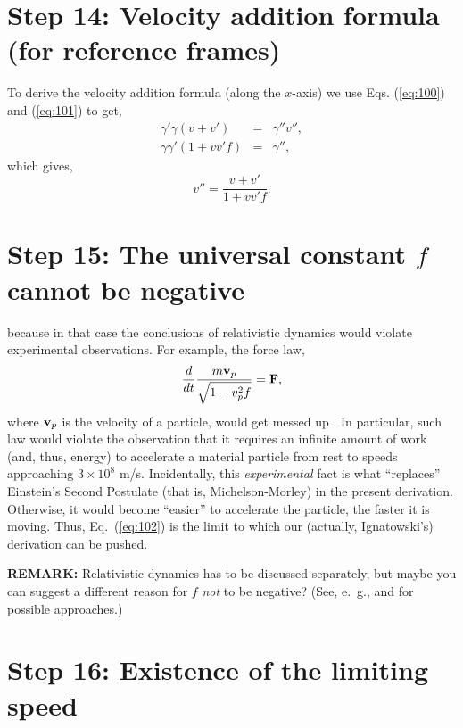 \documentclass[twocolumn,preprintnumbers,amsmath,amssymb,final]{revtex4}
\def\BEq{\begin{equation}}
\def\EEq{\end{equation}}
\def\BEqA{\begin{eqnarray}}
\def\EEqA{\end{eqnarray}}
\def\g{\gamma}
\begin{document}
\section*{Step 14: Velocity addition formula (for reference frames)}
 
\noindent To derive the velocity addition formula
(along the $x$-axis) we use Eqs. (\ref{eq:100}) and (\ref{eq:101}) to get,
\BEqA
\g'\g (v+v') &=& \g'' v'',
\\
\g \g' (1+vv' f) &=& \g'',
\EEqA
which gives,
\BEq
\label{eq:102}
v''=\frac{v+v'}{1+vv'f}.
\EEq


\section*{Step 15: The universal constant $f$ cannot be negative }
 
\noindent because in that case the conclusions of relativistic dynamics 
would violate experimental observations. For example, the force law,
\BEq
\label{eq:forceEquation}
\frac{d}{dt}\frac{m{\bf v}_{p}}{\sqrt{1-v_{p}^2f}} = {\bf F},
\EEq
where ${\bf v}_p$ is the velocity of a particle, would get messed up \cite{TERLETSKII1968}. 
In particular, such law would violate the observation that
it requires an infinite amount of work (and, thus, energy) to accelerate a material
particle from rest to speeds approaching $3\times10^8$ m/s.
Incidentally, this {\it experimental} fact is what ``replaces'' Einstein's Second Postulate (that is, Michelson-Morley) in the present derivation. Otherwise, it would become ``easier'' to accelerate the particle, the faster it is moving. Thus, Eq.\ (\ref{eq:102})
is the limit to which our (actually, Ignatowski's) derivation can be pushed.

\vskip10pt

{\bf REMARK:} Relativistic dynamics has to be discussed separately, 
but maybe you can suggest 
a different reason for $f$ {\it not} to be negative? 
(See, e.\ g., \cite{BERZI1969} and \cite{MERMIN1984} for possible 
approaches.)

\section*{Step 16: Existence of the limiting speed}
\end{document}

